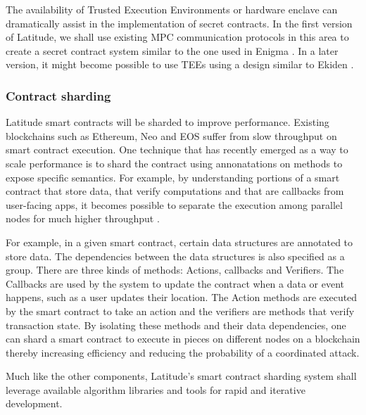 The availability of Trusted Execution Environments or hardware enclave can dramatically assist in the implementation of
secret contracts. In the first version of Latitude, we shall use existing MPC communication protocols in this area to
create a secret contract system similar to the one used in Enigma \cite{enigma}. In a later version, it might become
possible to use TEEs using a design similar to Ekiden \cite{ekiden}.



\subsubsection{Contract sharding}

Latitude smart contracts will be sharded to improve performance. Existing blockchains such as Ethereum, Neo and EOS
suffer from slow throughput on smart contract execution. One technique that has recently emerged as a way to scale
performance is to shard the contract using annonatations on methods to expose specific semantics. For example, by
understanding portions of a smart contract that store data, that verify computations and that are callbacks from
user-facing apps, it becomes possible to separate the execution among parallel nodes for much higher throughput
\cite{chainspace}. 

For example, in a given smart contract, certain data structures are annotated to store data. The dependencies between
the data structures is also specified as a group. There are three kinds of methods: Actions, callbacks and Verifiers. 
The Callbacks are used by the system to update the contract when a data or event happens, such as a user updates their
location. The Action methods are executed by the smart contract to take an action and the verifiers are methods that
verify transaction state. By isolating these methods and their data dependencies, one can shard a smart contract to
execute in pieces on different nodes on a blockchain thereby increasing efficiency and reducing the probability of a
coordinated attack.

Much like the other components, Latitude's smart contract sharding system shall leverage available algorithm libraries
and tools for rapid and iterative development.

